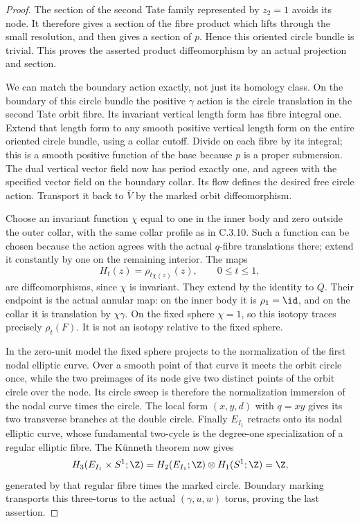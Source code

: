 \begin{proof}
The section of the second Tate family represented by $z_2=1$
avoids its node. It therefore gives a section of the fibre
product which lifts through the small resolution, and then
gives a section of $p$. Hence this oriented circle bundle is
trivial. This proves the asserted product diffeomorphism by
an actual projection and section.

We can match the boundary action exactly, not just its homology
class. On the boundary of this circle bundle the positive
$\gamma$ action is the circle translation in the second Tate
orbit fibre. Its invariant vertical length form has fibre
integral one. Extend that length form to any smooth positive
vertical length form on the entire oriented circle bundle,
using a collar cutoff. Divide on each fibre by its integral;
this is a smooth positive function of the base because $p$
is a proper submersion. The dual vertical vector field now has
period exactly one, and agrees with the specified vector field
on the boundary collar. Its flow defines the desired free
circle action. Transport it back to $\overline V$ by the marked
orbit diffeomorphism.

Choose an invariant function $\chi$ equal to one in the inner
body and zero outside the outer collar, with the same collar
profile as in C.3.10. Such a function can be chosen because
the action agrees with the actual $q$-fibre translations there;
extend it constantly by one on the remaining interior. The
maps
\[
 H_t(z)=\rho_{t\chi(z)}(z),\qquad 0\leq t\leq1,
\]
are diffeomorphisms, since $\chi$ is invariant. They extend
by the identity to $Q$. Their endpoint is the actual annular
map: on the inner body it is $\rho_1=\id$, and on the collar
it is translation by $\chi\gamma$. On the fixed sphere
$\chi=1$, so this isotopy traces precisely $\rho_t(F)$.
It is not an isotopy relative to the fixed sphere.

In the zero-unit model the fixed sphere projects to the
normalization of the first nodal elliptic curve. Over a smooth
point of that curve it meets the orbit circle once, while the
two preimages of its node give two distinct points of the
orbit circle over the node. Its circle sweep is therefore the
normalization immersion of the nodal curve times the circle.
The local form $(x,y,d)$ with $q=xy$ gives its two transverse
branches at the double circle. Finally $E_{I_1}$ retracts onto
its nodal elliptic curve, whose fundamental two-cycle is the
degree-one specialization of a regular elliptic fibre. The
K\"unneth theorem now gives
\[
 H_3(E_{I_1}\times S^1;\Z)
 =H_2(E_{I_1};\Z)\otimes H_1(S^1;\Z)=\Z,
\]
generated by that regular fibre times the marked circle.
Boundary marking transports this three-torus to the actual
$(\gamma,u,w)$ torus, proving the last assertion.
\end{proof}

